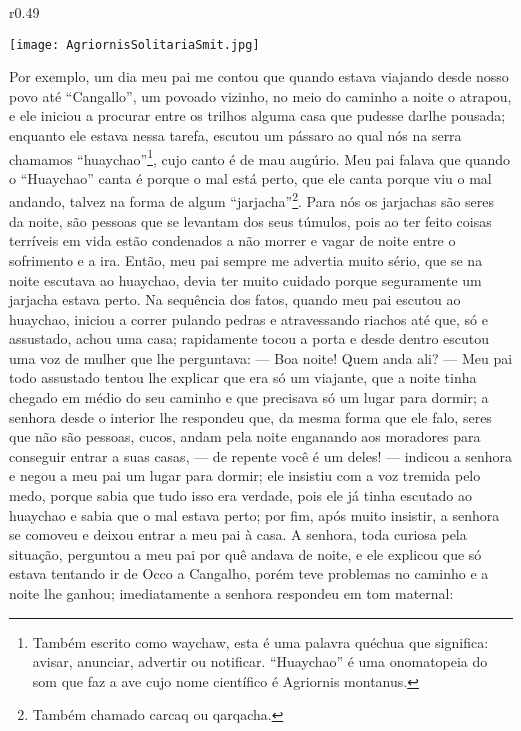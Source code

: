 \begin{wrapfigure}{r}{0.49\textwidth}
  \begin{center}
  \vspace{-20pt}
    \texttt{[image: AgriornisSolitariaSmit.jpg]}
  \end{center}
  \vspace{-20pt}
\end{wrapfigure}
Por exemplo, um dia meu pai me contou que quando estava viajando desde nosso povo até ``Cangallo'', um povoado vizinho, no meio do caminho a noite o atrapou, e ele iniciou a procurar entre os trilhos alguma casa que pudesse darlhe pousada; enquanto ele estava nessa tarefa, escutou um pássaro ao qual nós na serra chamamos ``huaychao''\footnote{Também escrito como waychaw, esta é uma palavra quéchua que significa: avisar, anunciar, advertir ou notificar. ``Huaychao'' é uma onomatopeia do som que faz a ave cujo nome científico é Agriornis montanus.}, cujo canto é de mau augúrio.
Meu pai falava que quando o ``Huaychao'' canta é porque o mal está perto, que ele canta porque viu o mal andando, talvez na forma de algum ``jarjacha''\footnote{Também chamado carcaq ou qarqacha.}. Para nós os jarjachas são seres da noite, são pessoas que se levantam dos seus túmulos, pois ao ter feito coisas terríveis em vida estão condenados a não morrer e vagar de noite entre o sofrimento e a ira. 
Então, meu pai sempre me advertia muito sério, que se na noite escutava ao huaychao, devia ter muito cuidado porque seguramente um jarjacha estava perto. 
Na sequência dos fatos, quando meu pai escutou ao huaychao, iniciou a correr pulando pedras e atravessando riachos até que, só e assustado, achou uma casa; rapidamente tocou a porta e desde dentro escutou uma voz de mulher que lhe perguntava: 
--- Boa noite! Quem anda ali? ---
Meu pai todo assustado tentou lhe explicar que era só um viajante, que a noite tinha chegado em médio do seu caminho e que precisava só um lugar para dormir; a senhora desde o interior lhe respondeu que, da mesma forma que ele falo, seres que não são pessoas, cucos, andam pela noite enganando aos moradores para conseguir entrar a suas casas, 
--- de repente você é um deles! --- indicou a senhora e negou a meu pai um lugar para dormir; ele insistiu com a voz tremida pelo medo, porque sabia que tudo isso era verdade, pois ele já tinha escutado ao huaychao e sabia que o mal estava perto; por fim, após muito insistir, a senhora se comoveu e deixou entrar a meu pai à casa. 
A senhora, toda curiosa pela situação, perguntou a meu pai por quê andava de noite, e ele explicou que só estava tentando ir de Occo a Cangalho, porém teve problemas no caminho e a noite lhe ganhou; imediatamente a senhora respondeu em tom maternal: 

